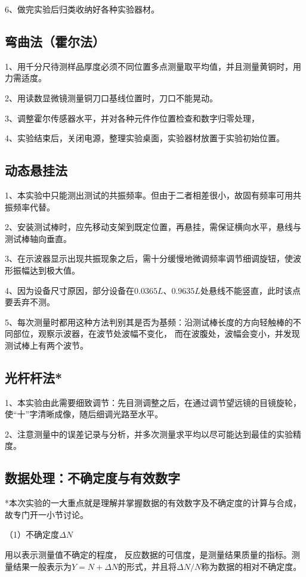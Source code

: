 \documentclass[11pt]{article}
\begin{document}
6、做完实验后归类收纳好各种实验器材。
\subsection{弯曲法（霍尔法）}
1、用千分尺待测样品厚度必须不同位置多点测量取平均值，并且测量黄铜时，用力需适度。

2、用读数显微镜测量铜刀口基线位置时，刀口不能晃动。

3、调整霍尔传感器水平，并对各种元件作位置检查和数字归零处理，

4、实验结束后，关闭电源，整理实验桌面，实验器材放置于实验初始位置。

\subsection{动态悬挂法}
1、本实验中只能测出测试的共振频率。但由于二者相差很小，故固有频率可用共振频率代替。

2、安装测试棒时，应先移动支架到既定位置，再悬挂，需保证横向水平，悬线与测试棒轴向垂直。

3、在示波器显示出现共振现象之后，需十分缓慢地微调频率调节细调旋钮，使波形振幅达到极大值。

4、因为设备尺寸原因，部分设备在$0.0365L$、$ 0.9635L$处悬线不能竖直，此时该点要丢弃不测。

5、每次测量时都用这种方法判别其是否为基频：沿测试棒长度的方向轻触棒的不同部位，观察示波器，在波节处波幅不变化，
而在波腹处，波幅会变小，并发现测试棒上有两个波节。

\subsection{光杆杆法*}
1、本实验由此需要细致调节：先目测调整之后，在通过调节望远镜的目镜旋轮，
使“十”字清晰成像，随后细调光路至水平。

2、注意测量中的误差记录与分析，并多次测量求平均以尽可能达到最佳的实验精度。



\subsection{数据处理：不确定度与有效数字}

*本次实验的一大重点就是理解并掌握数据的有效数字及不确定度的计算与合成，
故专门开一小节讨论。

\bigskip
\noindent（1）不确定度$\Delta N$

用以表示测量值不确定的程度，
反应数据的可信度，是测量结果质量的指标。测量结果一般表示为$Y=N+\Delta N$的形式，并且将$\Delta N/N$称为数据的相对不确定度。
\end{document}
